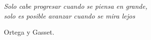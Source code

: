 

\chapter*{}
\setlength{\leftmargin}{0.5\textwidth}
\setlength{\parsep}{0cm}
\addtolength{\topsep}{0.5cm}
\begin{flushright}
\small\em{
Solo cabe progresar cuando se piensa en grande,\\
solo es posible avanzar cuando se mira lejos
}
\end{flushright}
\begin{flushright}
\small{
Ortega y Gasset.
}
\end{flushright}
\cleardoublepage %
